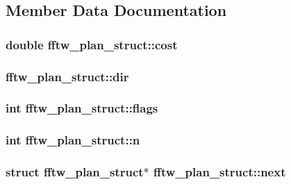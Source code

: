 \subsection{Member Data Documentation}
\hypertarget{structfftw__plan__struct_af99ad45f9bb1e7847dad9df5e4265ba8}{
\subsubsection[{cost}]{\setlength{\rightskip}{0pt plus 5cm}double fftw\-\_\-plan\-\_\-struct\-::cost}}\label{structfftw__plan__struct_af99ad45f9bb1e7847dad9df5e4265ba8}
\hypertarget{structfftw__plan__struct_ad01c0441a28c1e72360a6b42f6d63689}{
\subsubsection[{dir}]{ fftw\-\_\-plan\-\_\-struct\-::dir}}\label{structfftw__plan__struct_ad01c0441a28c1e72360a6b42f6d63689}
\hypertarget{structfftw__plan__struct_a437b5a527bdd148ae864289d5d173811}{
\subsubsection[{flags}]{\setlength{\rightskip}{0pt plus 5cm}int fftw\-\_\-plan\-\_\-struct\-::flags}}\label{structfftw__plan__struct_a437b5a527bdd148ae864289d5d173811}
\hypertarget{structfftw__plan__struct_a13ec77a105b6c2e62add092d1d2de42c}{
\subsubsection[{n}]{\setlength{\rightskip}{0pt plus 5cm}int fftw\-\_\-plan\-\_\-struct\-::n}}\label{structfftw__plan__struct_a13ec77a105b6c2e62add092d1d2de42c}
\hypertarget{structfftw__plan__struct_a626c58bf93a8b08eba8826ecc0c48781}{
\subsubsection[{next}]{\setlength{\rightskip}{0pt plus 5cm}struct {\bf fftw\-\_\-plan\-\_\-struct}$\ast$ fftw\-\_\-plan\-\_\-struct\-::next}}\label{structfftw__plan__struct_a626c58bf93a8b08eba8826ecc0c48781}
